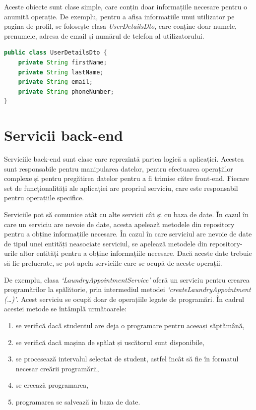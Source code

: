 \documentclass[12pt,a4paper]{report}
\theoremstyle{definition}
\theoremstyle{remark}
\begin{document}
\par Aceste obiecte sunt clase simple, care conțin doar informațiile necesare pentru o anumită operație. De exemplu, pentru a afișa informațiile unui utilizator pe pagina de profil, se folosește clasa \textit{UserDetailsDto}, care conține doar numele, prenumele, adresa de email și numărul de telefon al utilizatorului.

\begin{lstlisting}[language=Java, caption={Clasa UserDetailsDto}]
public class UserDetailsDto {
    private String firstName;
    private String lastName;
    private String email;
    private String phoneNumber;
}
\end{lstlisting}

\section{Servicii back-end}
\par Serviciile back-end sunt clase care reprezintă partea logică a aplicației. Acestea sunt responsabile pentru manipularea datelor, pentru efectuarea operațiilor complexe și pentru pregătirea datelor pentru a fi trimise către front-end. Fiecare set de funcționalități ale aplicației are propriul serviciu, care este responsabil pentru operațiile specifice.

\par Serviciile pot să comunice atât cu alte servicii cât și cu baza de date. În cazul în care un serviciu are nevoie de date, acesta apelează metodele din repository pentru a obține informațiile necesare. În cazul în care serviciul are nevoie de date de tipul unei entități neasociate serviciul, se apelează metodele din repository-urile altor entități pentru a obține informațiile necesare. Dacă aceste date trebuie să fie prelucrate, se pot apela serviciile care se ocupă de aceste operații.

\par De exemplu, clasa \textit{`LaundryAppointmentService'} oferă un serviciu pentru crearea programărilor la spălătorie, prin intermediul metodei \textit{`createLaundryAppointment (\ldots)'}. Acest serviciu se ocupă doar de operațiile legate de programări. În cadrul acestei metode se întâmplă următoarele:

\begin{enumerate}
    \item se verifică dacă studentul are deja o programare pentru aceeași săptămână,
    \item se verifică dacă mașina de spălat și uscătorul sunt disponibile,
    \item se procesează intervalul selectat de student,  astfel încât să fie în formatul necesar creării programării,
    \item se creează programarea,
    \item programarea se salvează în baza de date.
\end{enumerate}
\end{document}
